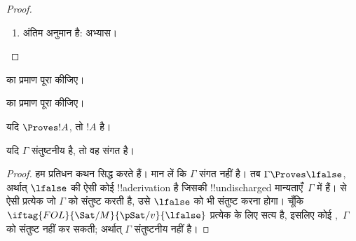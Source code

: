 \documentclass[../../../include/open-logic-section]{subfiles}
\begin{document}
\begin{proof}
\begin{enumerate}
\item अंतिम अनुमान \Elim{\lnot} है: अभ्यास।
  
\end{enumerate}
\end{proof}

\begin{prob}
 का प्रमाण पूरा कीजिए।
\end{prob}
\tagendprob

\begin{prob}
 का प्रमाण पूरा कीजिए।
\end{prob}
\tagendprob

\begin{cor}
यदि $\Proves !A$, तो $!A$  है।
\end{cor}

\begin{cor}
यदि $\Gamma$ संतुष्टनीय है, तो वह संगत है।
\end{cor}

\begin{proof}
हम प्रतिधन कथन सिद्ध करते हैं। मान लें कि $\Gamma$ संगत नहीं है। तब
$\Gamma \Proves \lfalse$, अर्थात् $\lfalse$ की ऐसी कोई !!a{derivation} है
जिसकी !!{undischarged} मान्यताएँ~$\Gamma$ में हैं।
 से ऐसी प्रत्येक
जो $\Gamma$ को संतुष्ट करती है, उसे $\lfalse$ को भी संतुष्ट करना होगा। चूँकि
$\iftag{FOL}{\Sat/{M}}{\pSat/{v}}{\lfalse}$ प्रत्येक
 के लिए
सत्य है, इसलिए कोई
,~$\Gamma$ को संतुष्ट नहीं कर सकती;
अर्थात् $\Gamma$ संतुष्टनीय नहीं है।
\end{proof}
\end{document}
